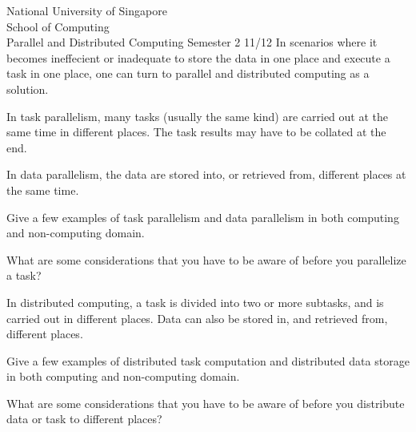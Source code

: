 \documentclass[answers,a4paper,11pt]{exam}
\begin{document}
\extraheadheight{.5in}
%
{\large\sf National University of Singapore\\ School of Computing \\
\LARGE\sf Parallel and Distributed Computing}%
{\large\sf Semester 2 11/12}
\firstpageheadrule
\pagestyle{headandfoot}
In scenarios where it becomes ineffecient or inadequate to store the data in one place and execute a task in one place, one can turn to parallel and distributed computing as a solution.

\begin{questions}
\question
In task parallelism, many tasks (usually the same kind) are carried out at the same time in different places.  The task results may have to be collated at the end.

In data parallelism, the data are stored into, or retrieved from, different places at the same time.

Give a few examples of task parallelism and data parallelism in both computing and non-computing domain.
\fillwithdottedlines{3in}

\question
What are some considerations that you have to be aware of before you parallelize a task?
\fillwithdottedlines{3in}

\newpage
\question
In distributed computing, a task is divided into two or more subtasks, and is carried out in different places.  Data can also be stored in, and retrieved from, different places.

Give a few examples of distributed task computation and distributed data storage in both computing and non-computing domain.
\fillwithdottedlines{3in}

\question
What are some considerations that you have to be aware of before you distribute data or task to different places?
\fillwithdottedlines{3in}

\end{questions}
\end{document}
